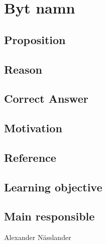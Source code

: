\documentclass[a4paper]{article}
\begin{document}
\section{Byt namn}
\subsection*{Proposition}

\subsection*{Reason}

\subsection*{Correct Answer}

\subsection*{Motivation}
 
\subsection*{Reference}

\subsection*{Learning objective}

\subsection*{Main responsible}
Alexander Nässlander
\end{document}

